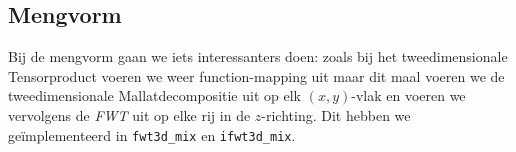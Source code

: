 \subsection{Mengvorm}
Bij de mengvorm gaan we iets interessanters doen: zoals bij het tweedimensionale Tensorproduct
voeren we weer function-mapping uit maar dit maal voeren we de tweedimensionale Mallatdecompositie
uit op elk $(x,y)$-vlak en voeren we vervolgens de \emph{FWT} uit op elke rij in de $z$-richting.
Dit hebben we ge\"implementeerd in \texttt{fwt3d\_mix} en \texttt{ifwt3d\_mix}.
